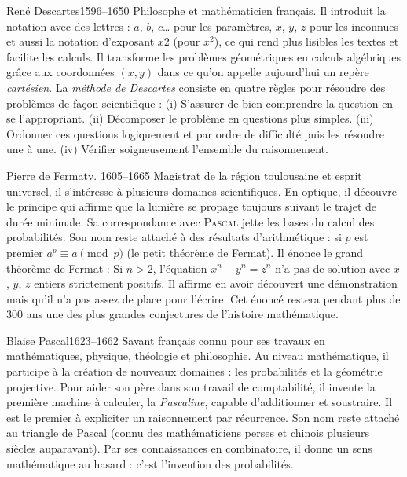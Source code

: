 \documentclass[10pt,class=article,crop=false]{standalone}
\begin{document}
\begin{multicols}{2}
\begin{biographie}{René Descartes}{1596--1650}
Philosophe et mathématicien français.
Il introduit la notation avec des lettres : $a$, $b$, $c$\ldots{} pour les paramètres, $x$, $y$, $z$ pour les inconnues et aussi la notation d'exposant $x2$ (pour $x^2$), ce qui rend plus lisibles les textes et facilite les calculs. 
Il transforme les problèmes géométriques en calculs algébriques grâce aux coordonnées $(x,y)$ dans ce qu'on appelle aujourd'hui un repère \emph{cartésien}.
La \emph{méthode de Descartes} consiste en quatre règles pour résoudre des problèmes de façon scientifique :
(i) S'assurer de bien comprendre la question en se l'appropriant.
(ii) Décomposer le problème en questions plus simples.
(iii) Ordonner ces questions logiquement et par ordre de difficulté puis les résoudre une à une.
(iv) Vérifier soigneusement l'ensemble du raisonnement.
\end{biographie}


\begin{biographie}{Pierre de Fermat}{v. 1605--1665}
Magistrat de la région toulousaine et esprit universel, il s’intéresse à plusieurs domaines scientifiques. En optique, il découvre le principe
qui affirme que la lumière se propage toujours suivant le trajet de durée minimale.  Sa correspondance avec \textsc{Pascal} jette les bases du calcul des probabilités. 
Son nom reste attaché à des résultats d'arithmétique : \og{}si $p$ est premier $a^p \equiv a \pmod{p}$\fg{} (le petit théorème de Fermat). Il énonce le \og{}grand théorème de Fermat\fg{} : \og{}Si $n>2$, l'équation $x^n + y^n = z^n$ n'a pas de solution avec $x$, $y$, $z$ entiers strictement positifs.\fg{} Il affirme en avoir découvert une démonstration mais qu'il n'a pas assez de place pour l'écrire. Cet énoncé restera pendant plus de 300 ans une des plus grandes conjectures de l'histoire mathématique.
\end{biographie}


\begin{biographie}{Blaise Pascal}{1623--1662}
Savant français connu pour ses travaux en mathématiques, physique, théologie et philosophie.
Au niveau mathématique, il participe à la création de nouveaux domaines : les probabilités et la géométrie projective. Pour aider son père dans son travail de comptabilité, il invente la première machine à calculer, la \emph{Pascaline}, capable d'additionner et soustraire. Il est le premier à expliciter un raisonnement par récurrence.
Son nom reste attaché au triangle de Pascal (connu des mathématiciens perses et chinois plusieurs siècles auparavant). Par ses connaissances en combinatoire, il donne un sens mathématique au hasard : c'est l'invention des probabilités.
\end{biographie}



\end{multicols}
\end{document}

